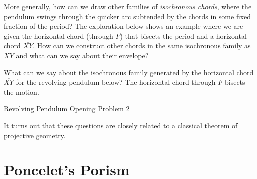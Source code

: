\documentclass{ximera}
\begin{document}
More generally, how can we draw other families of \emph{isochronous chords}, where the pendulum swings through the quicker arc subtended by the chords in some fixed fraction of the period?  The exploration below shows an example where we are given the horizontal chord (through $F$) that bisects the period and a horizontal chord $\overline{XY}$. How can we construct other chords in the same isochronous family as $\overline{XY}$ and what can we say about their envelope? %




\begin{exploration}
What can we say about the isochronous family generated by the horizontal chord $\overline{XY}$ for the revolving pendulum below? The horizontal chord through $F$ bisects the motion.

\begin{onlineOnly}
    \begin{center}
\end{center}
\end{onlineOnly}

\href{https://www.desmos.com/calculator/1kyfdn6yyc}{Revolving Pendulum Opening Problem 2}

\end{exploration}

It turns out that these questions are closely related to a classical theorem of projective geometry. %




\section*{Poncelet's Porism}


\end{document}
